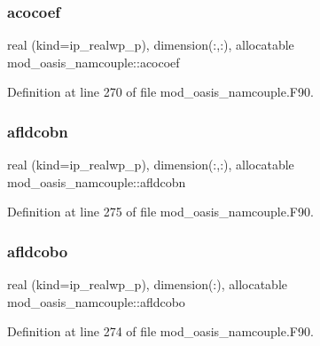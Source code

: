 \subsubsection{\texorpdfstring{acocoef}{acocoef}}
{\footnotesize\ttfamily real (kind=ip\+\_\+realwp\+\_\+p), dimension(\+:,\+:), allocatable mod\+\_\+oasis\+\_\+namcouple\+::acocoef\hspace{0.3cm}{\ttfamily [private]}}



Definition at line 270 of file mod\+\_\+oasis\+\_\+namcouple.\+F90.

\mbox{\label{namespacemod__oasis__namcouple_a8f9d02a3ec2e9e46742d6c6073b39199}} 
\subsubsection{\texorpdfstring{afldcobn}{afldcobn}}
{\footnotesize\ttfamily real (kind=ip\+\_\+realwp\+\_\+p), dimension(\+:,\+:), allocatable mod\+\_\+oasis\+\_\+namcouple\+::afldcobn\hspace{0.3cm}{\ttfamily [private]}}



Definition at line 275 of file mod\+\_\+oasis\+\_\+namcouple.\+F90.

\mbox{\label{namespacemod__oasis__namcouple_aa9d178659282698ffb6c186ff48bed3c}} 
\subsubsection{\texorpdfstring{afldcobo}{afldcobo}}
{\footnotesize\ttfamily real (kind=ip\+\_\+realwp\+\_\+p), dimension(\+:), allocatable mod\+\_\+oasis\+\_\+namcouple\+::afldcobo\hspace{0.3cm}{\ttfamily [private]}}



Definition at line 274 of file mod\+\_\+oasis\+\_\+namcouple.\+F90.

\mbox{\label{namespacemod__oasis__namcouple_a19fb86d643bb8761d5a8e32d645d5963}} 
